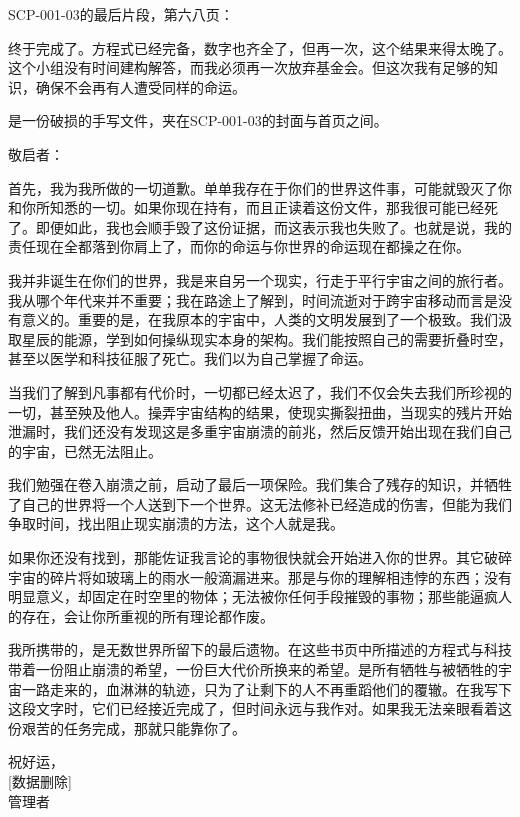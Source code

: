 SCP-001-03的最后片段，第六八页：

\begin{scpbox}

终于完成了。方程式已经完备，数字也齐全了，但再一次，这个结果来得太晚了。这个小组没有时间建构解答，而我必须再一次放弃基金会。但这次我有足够的知识，确保不会再有人遭受同样的命运。

\end{scpbox}

是一份破损的手写文件，夹在SCP-001-03的封面与首页之间。

\begin{scpbox}

敬启者：

首先，我为我所做的一切道歉。单单我存在于你们的世界这件事，可能就毁灭了你和你所知悉的一切。如果你现在持有，而且正读着这份文件，那我很可能已经死了。即便如此，我也会顺手毁了这份证据，而这表示我也失败了。也就是说，我的责任现在全都落到你肩上了，而你的命运与你世界的命运现在都操之在你。

我并非诞生在你们的世界，我是来自另一个现实，行走于平行宇宙之间的旅行者。我从哪个年代来并不重要；我在路途上了解到，时间流逝对于跨宇宙移动而言是没有意义的。重要的是，在我原本的宇宙中，人类的文明发展到了一个极致。我们汲取星辰的能源，学到如何操纵现实本身的架构。我们能按照自己的需要折叠时空，甚至以医学和科技征服了死亡。我们以为自己掌握了命运。

当我们了解到凡事都有代价时，一切都已经太迟了，我们不仅会失去我们所珍视的一切，甚至殃及他人。操弄宇宙结构的结果，使现实撕裂扭曲，当现实的残片开始泄漏时，我们还没有发现这是多重宇宙崩溃的前兆，然后反馈开始出现在我们自己的宇宙，已然无法阻止。

我们勉强在卷入崩溃之前，启动了最后一项保险。我们集合了残存的知识，并牺牲了自己的世界将一个人送到下一个世界。这无法修补已经造成的伤害，但能为我们争取时间，找出阻止现实崩溃的方法，这个人就是我。

如果你还没有找到，那能佐证我言论的事物很快就会开始进入你的世界。其它破碎宇宙的碎片将如玻璃上的雨水一般滴漏进来。那是与你的理解相违悖的东西；没有明显意义，却固定在时空里的物体；无法被你任何手段摧毁的事物；那些能逼疯人的存在，会让你所重视的所有理论都作废。

我所携带的，是无数世界所留下的最后遗物。在这些书页中所描述的方程式与科技带着一份阻止崩溃的希望，一份巨大代价所换来的希望。是所有牺牲与被牺牲的宇宙一路走来的，血淋淋的轨迹，只为了让剩下的人不再重蹈他们的覆辙。在我写下这段文字时，它们已经接近完成了，但时间永远与我作对。如果我无法亲眼看着这份艰苦的任务完成，那就只能靠你了。

祝好运，\\
{[}数据删除]\\
管理者

\end{scpbox}

